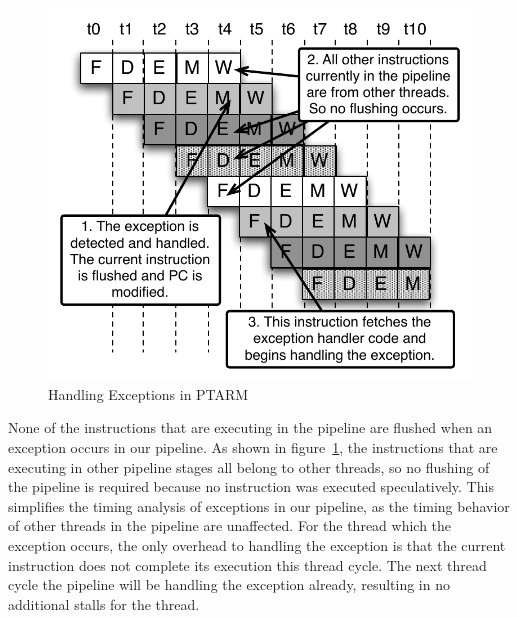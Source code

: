 \begin{figure}
  \vspace{-20pt}
  \begin{center}
    \includegraphics[scale=.65]{figs/exception_handling_pipeline}
  \end{center}
  \vspace{-20pt}
  \caption{Handling Exceptions in PTARM}
  \label{fig:exception_handling_pipeline}
  \vspace{-10pt}
\end{figure} 
None of the instructions that are executing in the pipeline are flushed when an exception occurs in our pipeline. 
As shown in figure~\ref{fig:exception_handling_pipeline}, the instructions that are executing in other pipeline stages all belong to other threads, so no flushing of the pipeline is required because no instruction was executed speculatively.
This simplifies the timing analysis of exceptions in our pipeline, as the timing behavior of other threads in the pipeline are unaffected.
For the thread which the exception occurs, the only overhead to handling the exception is that the current instruction does not complete its execution this thread cycle.  
The next thread cycle the pipeline will be handling the exception already, resulting in no additional stalls for the thread.

